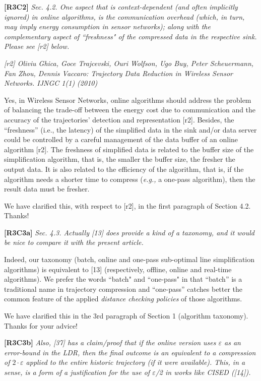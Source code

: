 \documentclass{letter}
\newcommand{\eg}{\emph{e.g.,}\xspace}
\begin{document}
\textbf{[R3C2]} \emph{
Sec. 4.2. One aspect that is context-dependent (and often implicitly ignored) in online algorithms, is the communication overhead (which, in turn, may imply energy consumption in sensor networks); along with the complementary aspect of ``freshness" of the compressed data in the respective sink. Please see [r2] below.}

\emph{[r2] Oliviu Ghica, Goce Trajcevski, Ouri Wolfson, Ugo Buy, Peter Scheuermann, Fan Zhou, Dennis Vaccaro: Trajectory Data Reduction in Wireless Sensor Networks. IJNGC 1(1) (2010)
}

{Yes, in Wireless Sensor Networks, online algorithms should address the problem of balancing the trade-off between the energy cost due to communication and the accuracy of the trajectories' detection and representation [r2].} Besides, the ``freshness'' (i.e., the latency) of the simplified data in the sink and/or data server could be controlled by a careful management of the data buffer of an online algorithm [r2]. The freshness of simplified data is related to the buffer size of the simplification algorithm, that is, the smaller the buffer size, the fresher the output data. It is also related to the efficiency of the algorithm, that is, if the algorithm needs a shorter time to compress (\eg a one-pass algorithm), then the result data must be fresher.

We have clarified this, with respect to [r2], in the first paragraph of Section 4.2.
Thanks!

\textbf{[R3C3a]} \emph{
Sec. 4.3. Actually [13] does provide a kind of a taxonomy, and it would be nice to compare it with the present article. }

Indeed, our taxonomy (batch, online and one-pass sub-optimal line simplification algorithms) is equivalent to [13] (respectively, offline, online and real-time algorithms).
We prefer the words ``batch" and ``one-pass" in that ``batch'' is a traditional name in trajectory compression and ``one-pass'' catches  better the common feature of the applied \emph{distance checking policies} of those algorithms.

We have clarified this in the 3rd paragraph of Section 1 (algorithm taxonomy).
Thanks for your advice!

\textbf{[R3C3b]} \emph{Also, [37] has a claim/proof that if the online version uses $\varepsilon$ as an error-bound in the LDR, then the final outcome is an equivalent to a compression of $2 \cdot \varepsilon$ applied to the entire historic trajectory (if it were available). This, in a sense, is a form of a justification for the use of $\varepsilon$/2 in works like CISED ([14]).}
\end{document}
